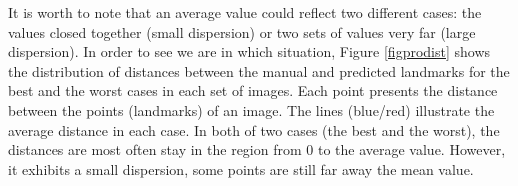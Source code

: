 \documentclass[review]{elsarticle}
\begin{document}
It is worth to note that an average value could reflect two different cases: the values closed together (small dispersion) or two sets of values very far (large dispersion). In order to see we are in which situation, Figure \ref{figprodist} shows the distribution of distances between the manual and predicted landmarks for the best and the worst cases in each set of images. Each point presents the distance between the points (landmarks) of an image. The lines (blue/red) illustrate the average distance in each case. In both of two cases (the best and the worst), the distances are most often stay in the region from 0 to the average value. However, it exhibits a small dispersion, some points are still far away the mean value.

\begin{figure}[h!]
    \centering
    \hspace{0.5cm}
~\\
\hspace{0.5cm}
~\\

\end{figure}
\end{document}
